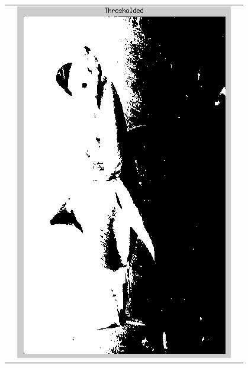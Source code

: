 \documentclass[12pt]{article}
\begin{document}
\begin{table}[h!]
\begin{center}
\begin{tabular} {c c c}
&
  \includegraphics[scale=.52]{Images/TotalModule/Thresholded.png}
\end{tabular}
\end{center}
\end{table}
\end{document}
